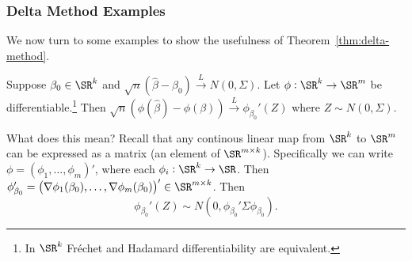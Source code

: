\subsubsection{Delta Method Examples}%
\label{subsubsec:delta-method-examples}

We now turn to some examples to show the usefulness of Theorem~\ref{thm:delta-method}.
\begin{example}
	\label{ex:beta-hat-delta-method}
	Suppose \(\beta_0\in\SR^k\) and \( \sqrt{n}(\widehat\beta-\beta_0)\overset{L}{\to}N(0,\Sigma)\). Let \(\phi:\SR^k\to\SR^m\) be differentiable.\footnote{In \(\SR^k\) Fréchet and Hadamard differentiability are equivalent.} Then \(\sqrt{n}(\phi(\hat\beta)-\phi(\beta))\overset{L}{\to}\phi_{\beta_0}'(Z)\) where \(Z\sim N(0,\Sigma)\).

	What does this mean? Recall that any continous linear map from \(\SR^k\) to \( \SR^m\) can be expressed as a matrix (an element of \(\SR^{m\times k}\)). Specifically we can write \(\phi = \left(\phi_1,\dots,\phi_m\right)'\), where each \(\phi_i:\SR^k\to \SR\). Then \(\phi'_{\beta_0} = \left(\nabla\phi_1(\beta_0),\dots,\nabla\phi_m(\beta_0)\right)' \in \SR^{m\times k}\). Then
	\[
		\phi_{\beta_0}'(Z) \sim N\left(0,\phi_{\beta_0}'\Sigma\phi_{\beta_0}\right)
	.\]
\end{example}
